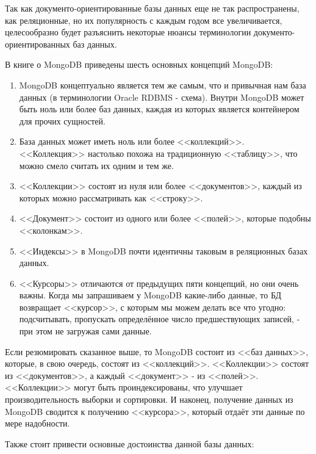 \documentclass[14pt]{extreport}
\begin{document}
Так как документо-ориентированные базы данных еще не так распространены, как реляционные, но их популярность с каждым годом все увеличивается, целесообразно будет разъяснить некоторые нюансы терминологии документо-ориентированных баз данных. 

В книге о MongoDB\cite{bib:mongo} приведены шесть основных концепций MongoDB:

\begin{enumerate}

\item MongoDB концептуально является тем же самым, что и привычная нам база данных (в терминологии Oracle RDBMS - схема). Внутри MongoDB может быть ноль или более баз данных, каждая из которых является контейнером для прочих сущностей.

\item База данных может иметь ноль или более <<коллекций>>. <<Коллекция>> настолько похожа на традиционную <<таблицу>>, что можно смело считать их одним и тем же.

\item <<Коллекции>> состоят из нуля или более <<документов>>, каждый из которых можно рассматривать как <<строку>>.

\item <<Документ>> состоит из одного или более <<полей>>, которые подобны <<колонкам>>.

\item <<Индексы>> в MongoDB почти идентичны таковым в реляционных базах данных.

\item <<Курсоры>> отличаются от предыдущих пяти концепций, но они очень важны. Когда мы запрашиваем у MongoDB какие-либо данные, то БД возвращает <<курсор>>, с которым мы можем делать все что угодно: подсчитывать, пропускать определённое число предшествующих записей, - при этом не загружая сами данные.

\end{enumerate}

Если резюмировать сказанное выше, то MongoDB состоит из <<баз данных>>, которые, в свою очередь, состоят из <<коллекций>>. <<Коллекции>> состоят из <<документов>>, а каждый <<документ>> - из <<полей>>. <<Коллекции>> могут быть проиндексированы, что улучшает производительность выборки и сортировки. И наконец, получение данных из MongoDB сводится к получению <<курсора>>, который отдаёт эти данные по мере надобности.

Также стоит привести основные достоинства данной базы данных:
\end{document}
